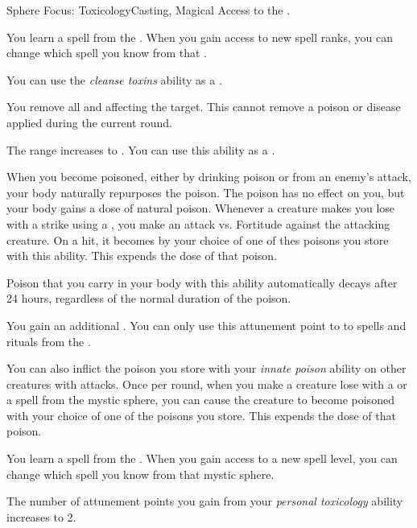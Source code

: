     \begin{feat}{Sphere Focus: Toxicology}{Casting, Magical}
        \featpre Access to the  .

         You learn a spell from the  .
        When you gain access to new spell ranks, you can change which spell you know from that .

         You can use the \textit{cleanse toxins} ability as a .
        \begin{freeability}{}
            You remove all  and  affecting the target.
            This cannot remove a poison or disease applied during the current round.

            \rankline
             The range increases to \rngmed.
             You can use this ability as a .
        \end{freeability}

        When you become poisoned, either by drinking poison or from an enemy's attack, your body naturally repurposes the poison.
        The poison has no effect on you, but your body gains a dose of natural poison.
        Whenever a creature makes you lose  with a  strike using a , you make an attack vs. Fortitude against the attacking creature.
        On a hit, it becomes  by your choice of one of thes poisons you store with this ability.
        This expends the dose of that poison.

        Poison that you carry in your body with this ability automatically decays after 24 hours, regardless of the normal duration of the poison.

         You gain an additional .
        You can only use this attunement point to  to spells and rituals from the  .

        You can also inflict the poison you store with your \textit{innate poison} ability on other creatures with attacks.
        Once per round, when you make a creature lose  with a  or a spell from the  mystic sphere, you can cause the creature to become poisoned with your choice of one of the poisons you store.
        This expends the dose of that poison.

         You learn a spell from the  .
        When you gain access to a new spell level, you can change which spell you know from that mystic sphere.

         The number of attunement points you gain from your \textit{personal toxicology} ability increases to 2.
    \end{feat}

